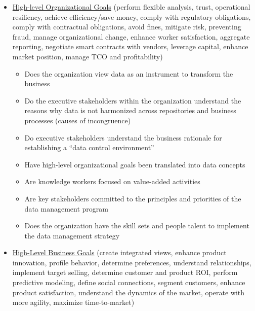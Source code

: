 
\begin{itemize}
  \item \ul{High-level Organizational Goals} (perform flexible analysis, trust, operational resiliency, achieve efficiency/save money, comply with regulatory obligations, comply with contractual obligations, avoid fines, mitigate risk, preventing fraud, manage organizational change, enhance worker satisfaction, aggregate reporting, negotiate smart contracts with vendors, leverage capital, enhance market position, manage TCO and profitability)

    \begin{itemize}
      \item Does the organization view data as an instrument to transform the business
      \item Do the executive stakeholders within the organization understand the reasons why data is not harmonized across repositories and business processes (causes of incongruence)
      \item Do executive stakeholders understand the business rationale for establishing a “data control environment”
      \item Have high-level organizational goals been translated into data concepts
      \item Are knowledge workers focused on value-added activities
      \item Are key stakeholders committed to the principles and priorities of the data management program
      \item Does the organization have the skill sets and people talent to implement the data management strategy
    \end{itemize}

  \item \ul{High-Level Business Goals} (create integrated views, enhance product innovation, profile behavior, determine preferences, understand relationships, implement target selling, determine customer and product ROI, perform predictive modeling, define social connections, segment customers, enhance product satisfaction, understand the dynamics of the market, operate with more agility, maximize time-to-market)


\end{itemize}
